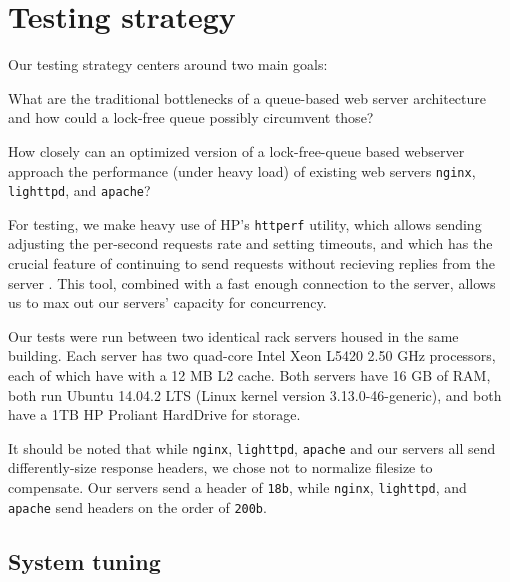 \documentclass[twoside,10pt]{article}
\begin{document}
\begin{multicols}{2}
\begin{Verbatim}[numbers=left,
                 fontsize=\small]

\end{Verbatim}

\section{Testing strategy}

Our testing strategy centers around two main goals:

\begin{compactitem}
\item What are the traditional bottlenecks of a queue-based web server
  architecture and how could a lock-free queue possibly circumvent
  those?
\item How closely can an optimized version of a lock-free-queue based
  webserver approach the performance (under heavy load) of existing
  web servers \verb+nginx+, \verb+lighttpd+, and \verb+apache+?
\end{compactitem}

For testing, we make heavy use of HP's \verb+httperf+ utility, which
allows sending adjusting the per-second requests rate and setting
timeouts, and which has the crucial feature of continuing to send
requests without recieving replies from the server
\cite{mosberger1998httperf}. This tool, combined with a fast
enough connection to the server, allows us to max out our servers'
capacity for concurrency.

Our tests were run between two identical rack servers housed in the
same building. Each server has two quad-core Intel Xeon L5420 2.50 GHz
processors, each of which have with a 12 MB L2 cache. Both servers
have 16 GB of RAM, both run Ubuntu 14.04.2 LTS (Linux kernel version
3.13.0-46-generic), and both have a 1TB HP Proliant HardDrive for
storage.

It should be noted that while \verb+nginx+, \verb+lighttpd+,
\verb+apache+ and our servers all send differently-size response
headers, we chose not to normalize filesize to compensate. Our servers
send a header of \verb+18b+, while \verb+nginx+, \verb+lighttpd+, and
\verb+apache+ send headers on the order of \verb+200b+.

\subsection{System tuning}


\end{multicols}
\end{document}
